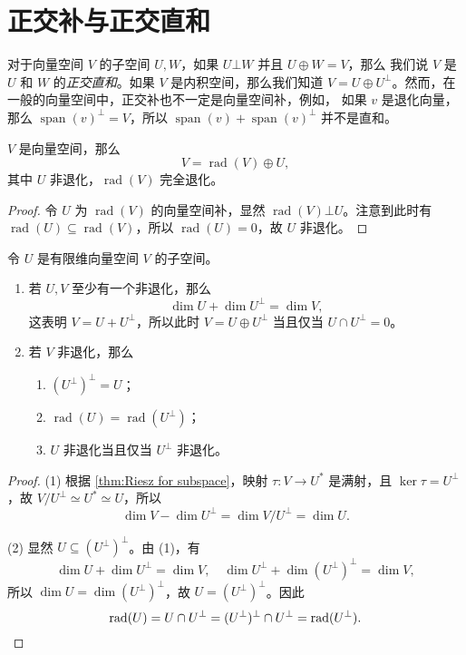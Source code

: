 \documentclass[fontset=none,zihao=-4]{Notes}
\DeclareMathOperator\rad{rad}
\newcommand{\spa}[1]{\operatorname{span}\left(#1\right)}
\begin{document}
\section{正交补与正交直和}

对于向量空间 $V$ 的子空间 $U,W$，如果 $U\bot W$ 并且 $U\oplus W=V$，那么
我们说 $V$ 是 $U$ 和 $W$ 的\emph{正交直和}。如果 $V$ 是内积空间，那么我们知道
$V=U\oplus U^\bot$。然而，在一般的向量空间中，正交补也不一定是向量空间补，例如，
如果 $v$ 是退化向量，那么 $\spa{v}^\bot=V$，所以 $\spa{v}+\spa{v}^\bot$ 并不是直和。

\begin{theorem}\label{thm:rad decomposition of V}
  $V$ 是向量空间，那么
  \[
    V=\rad(V)\oplus U,  
  \]
  其中 $U$ 非退化，$\rad(V)$ 完全退化。
\end{theorem}
\begin{proof}
  令 $U$ 为 $\rad(V)$ 的向量空间补，显然 $\rad(V)\bot U$。注意到此时有
  $\rad(U)\subseteq\rad (V)$，所以 $\rad(U)=0$，故 $U$ 非退化。
\end{proof}


\begin{theorem}\label{thm:property of direct complements}
  令 $U$ 是有限维向量空间 $V$ 的子空间。
  \begin{enumerate}
    \item 若 $U,V$ 至少有一个非退化，那么
    \[
      \dim U+\dim U^\bot=\dim V,  
    \]
    这表明 $V=U+U^\bot$，所以此时 $V=U\oplus U^\bot$ 当且仅当 $U\cap U^\bot=0$。
    \item 若 $V$ 非退化，那么
    \begin{enumerate}
      \item $(U^\bot)^\bot=U$；
      \item $\rad(U)=\rad(U^\bot)$；
      \item $U$ 非退化当且仅当 $U^\bot$ 非退化。
    \end{enumerate}
  \end{enumerate}
\end{theorem}
\begin{proof}
  (1) 根据 \autoref{thm:Riesz for subspace}，映射 $\tau:V\to U^*$ 是满射，且
  $\ker\tau=U^\bot$，故 $V/ U^\bot\simeq U^*\simeq U$，所以 
  \[
    \dim V-\dim U^\bot=\dim V/U^\bot=\dim U.
  \]

  (2) 显然 $U\subseteq (U^\bot)^\bot$。由 (1)，有
  \[
    \dim U+\dim U^\bot=\dim V, \quad \dim U^\bot+\dim(U^\bot)^\bot=\dim V,
  \]
  所以 $\dim U=\dim (U^\bot)^\bot$，故 $U=(U^\bot)^\bot$。因此
  \[
    \rad(U)=U\cap U^\bot=(U^\bot)^\bot\cap U^\bot=\rad(U^\bot).\qedhere
  \]
\end{proof}
\end{document}
